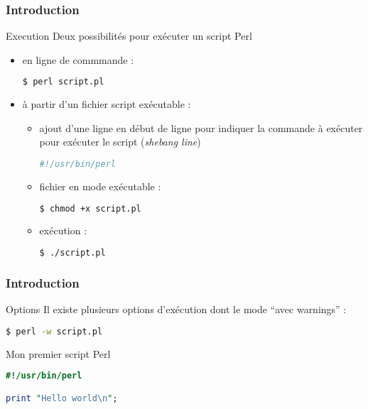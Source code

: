 \begin{frame}[fragile]
  \frametitle{Introduction}

  \begin{exampleblock}{Execution}
    Deux possibilités pour exécuter un script Perl
    \begin{itemize}
      \item en ligne de commmande :
        \begin{lstlisting}[language=bash]
$ perl script.pl
          \end{lstlisting}
      \item à partir d'un fichier script exécutable :
        \begin{itemize}
        \item ajout d'une ligne en début de ligne pour indiquer la commande
          à exécuter pour exécuter le script (\textit{shebang line})
          \begin{lstlisting}[language=bash]
#!/usr/bin/perl
          \end{lstlisting}
        \item fichier en mode exécutable :
          \begin{lstlisting}[language=bash]
$ chmod +x script.pl
          \end{lstlisting}
        \item exécution :
          \begin{lstlisting}[language=bash]
$ ./script.pl
          \end{lstlisting}
        \end{itemize}
    \end{itemize}
  \end{exampleblock}

\end{frame}

\begin{frame}[fragile]
  \frametitle{Introduction}

  \begin{alertblock}{Options}
    Il existe plusieurs options d'exécution dont le mode ``avec warnings'' :
    \begin{lstlisting}[language=bash]
$ perl -w script.pl
    \end{lstlisting}
  \end{alertblock}

  \begin{exampleblock}{Mon premier script Perl}
    \begin{lstlisting}[language=perl]
#!/usr/bin/perl

print "Hello world\n";
    \end{lstlisting}
  \end{exampleblock}

\end{frame}

